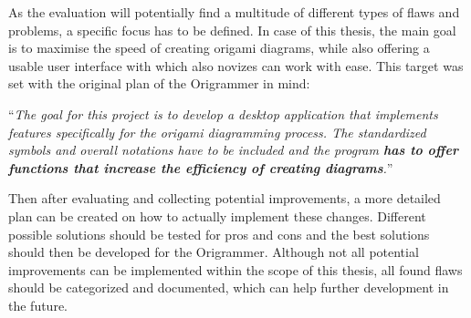 As the evaluation will potentially find a multitude of different types of flaws and problems, a specific focus has to be defined. In case of this thesis, the main goal is to maximise the speed of creating origami diagrams, while also offering a usable user interface with which also novizes can work with ease. This target was set with the original plan of the Origrammer in mind:

\begin{center}
\enquote{\emph{The goal for this project is to develop a desktop application that implements features specifically for the origami diagramming process. The standardized symbols and overall notations have to be included and the program \textbf{has to offer functions that increase the efficiency of creating diagrams}.}} \cite{origrammer}
\end{center}

Then after evaluating and collecting potential improvements, a more detailed plan can be created on how to actually implement these changes. Different possible solutions should be tested for pros and cons and the best solutions should then be developed for the Origrammer. Although not all potential improvements can be implemented within the scope of this thesis, all found flaws should be categorized and documented, which can help further development in the future.